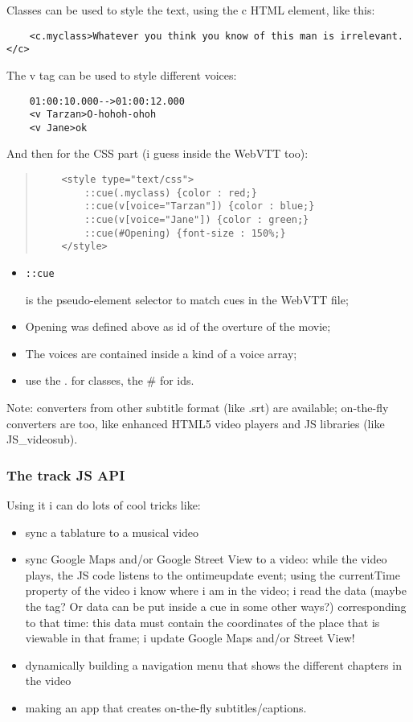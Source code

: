 \documentclass[a4paper,11pt]{book}
\begin{document}
	Classes can be used to style the text, using the c HTML element, like this:
	\begin{verbatim}
	<c.myclass>Whatever you think you know of this man is irrelevant.</c>
	\end{verbatim}
	The v tag can be used to style different voices:
	\begin{verbatim}
	01:00:10.000-->01:00:12.000
	<v Tarzan>O-hohoh-ohoh
	<v Jane>ok
	\end{verbatim}
	And then for the CSS part (i guess inside the WebVTT too):
	\begin{verse}
	\begin{verbatim}
	<style type="text/css">
		::cue(.myclass) {color : red;}
		::cue(v[voice="Tarzan"]) {color : blue;}
		::cue(v[voice="Jane"]) {color : green;}
		::cue(#Opening) {font-size : 150%;}
	</style>
	\end{verbatim}
	\end{verse}
	\begin{itemize}
	\item \begin{verbatim}::cue\end{verbatim} is the pseudo-element selector to match cues in the WebVTT file;
	\item Opening was defined above as id of the overture of the movie;
	\item The voices are contained inside a kind of a voice array;
	\item use the . for classes, the \# for ids.
	\end{itemize}
	Note: converters from other subtitle format (like .srt) are available; on-the-fly converters are too, like
	enhanced HTML5 video players and JS libraries (like JS\_videosub).
	
	\subsubsection{The track JS API}
	Using it i can do lots of cool tricks like:
	\begin{itemize}
	\item sync a tablature to a musical video
	\item sync Google Maps and/or Google Street View to a video: while the video plays, the JS code listens
		to the ontimeupdate event; using the currentTime property of the video i know where i am in the video;
		i read the data (maybe the tag? Or data can be put inside a cue in some other ways?) corresponding to
		that time: this data must contain the coordinates of the place that is viewable in that frame; i update
		Google Maps and/or Street View!
	\item dynamically building a navigation menu that shows the different chapters in the video
	\item making an app that creates on-the-fly subtitles/captions.
	\end{itemize}
	
\end{document}
